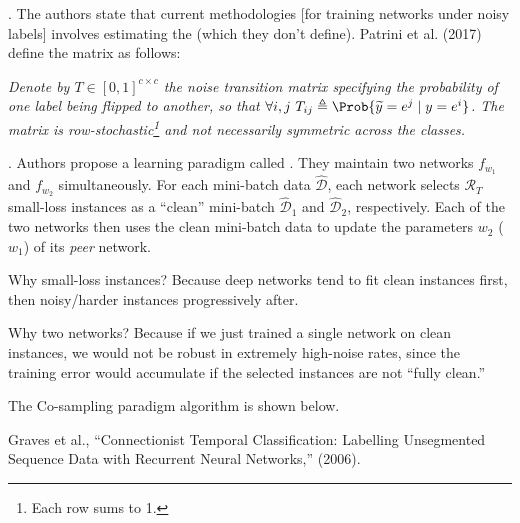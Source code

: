 \documentclass[11pt]{article}
\begin{document}
\p {}. The authors state that current methodologies [for training networks under noisy labels] involves estimating the  (which they don't define). Patrini et al. (2017) define the matrix as follows:
\begin{center}
	\begin{small}
		{\itshape 
			Denote by $T \in [0, 1]^{c \times c}$ the noise transition matrix specifying the probability of one label being flipped to another, so that $\forall i, j ~ T_{ij} \triangleq \Prob{\widetilde y = e^j \mid y = e^i}$. The matrix is row-stochastic\footnote{Each row sums to 1.} and not necessarily symmetric across the classes.
		}
	\end{small}
\end{center}


\myspace
\p {}. Authors propose a learning paradigm called . They maintain two networks $f_{w_1}$ and $f_{w_2}$ simultaneously. For each mini-batch data $\hat{\mathcal D}$, each network selects $\mathcal{R}_T$ small-loss instances as a ``clean'' mini-batch $\hat{\mathcal D}_1$ and $\hat{\mathcal D}_2$, respectively. Each of the two networks then uses the clean mini-batch data to update the parameters $w_2$ ($w_1$) of its \textit{peer} network.
\begin{compactitem}
	\item Why small-loss instances? Because deep networks tend to fit clean instances first, then noisy/harder instances progressively after. 
	\item Why two networks? Because if we just trained a single network on clean instances, we would not be robust in extremely high-noise rates, since the training error would accumulate if the selected instances are not ``fully clean.''
\end{compactitem}
The Co-sampling paradigm algorithm is shown below.






\vspace{-1em}
{\footnotesize Graves et al., ``Connectionist Temporal Classification: Labelling Unsegmented Sequence Data with Recurrent Neural Networks,'' (2006).}
\end{document}
